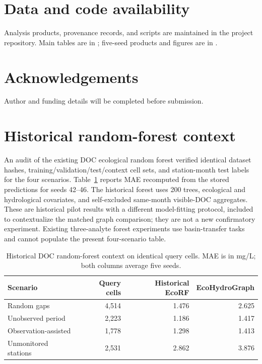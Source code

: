 \documentclass[11pt]{article}
\begin{document}
\section*{Data and code availability}
Analysis products, provenance records, and scripts are maintained in the project repository. Main tables are in ; five-seed products and figures are in .

\section*{Acknowledgements}Author and funding details will be completed before submission.

\appendix
\section{Historical random-forest context}\label{sec:rfcontext}
An audit of the existing DOC ecological random forest verified identical dataset hashes, training/validation/test/context cell sets, and station-month test labels for the four scenarios. Table~\ref{tab:rfcontext} reports MAE recomputed from the stored predictions for seeds 42--46. The historical forest uses 200 trees, ecological and hydrological covariates, and self-excluded same-month visible-DOC aggregates. These are historical pilot results with a different model-fitting protocol, included to contextualize the matched graph comparison; they are not a new confirmatory experiment. Existing three-analyte forest experiments use basin-transfer tasks and cannot populate the present four-scenario table.

\begin{table}[H]\centering\small
\caption{Historical DOC random-forest context on identical query cells. MAE is in mg/L; both columns average five seeds.}\label{tab:rfcontext}
\begin{tabular}{lrrr}\toprule
Scenario & Query cells & Historical EcoRF & EcoHydroGraph\\\midrule
Random gaps & 4,514 & 1.476 & 2.625\\
Unobserved period & 2,223 & 1.186 & 1.417\\
Observation-assisted & 1,778 & 1.298 & 1.413\\
Unmonitored stations & 2,531 & 2.862 & 3.876\\\bottomrule
\end{tabular}\end{table}
\end{document}
